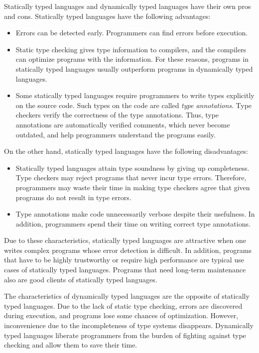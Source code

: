 Statically typed languages and dynamically typed languages have their own pros
and cons. Statically typed languages have the following advantages:
\begin{itemize}
  \item
Errors can be detected early. Programmers can find errors before execution.
  \item
    Static type checking
gives type information to compilers, and the compilers can optimize programs
with the information. For these reasons, programs in statically typed languages
usually outperform programs in dynamically typed languages.
  \item
    Some statically typed languages require programmers to write types explicitly
    on the source code. Such types on the code are called \textit{type
    annotations}. Type checkers verify the correctness of
    the type annotations. Thus, type annotations are automatically verified comments, which never
    become outdated, and help programmers understand the programs easily.
\end{itemize}
On the other hand, statically typed languages have the following disadvantages:
\begin{itemize}
  \item
Statically typed languages attain type soundness by giving up completeness.
Type checkers may reject programs that never incur type errors.
Therefore, programmers may waste their time in making type
checkers agree that given programs do not result in type errors.
  \item
Type annotations make code unnecessarily verbose despite their usefulness.
In addition, programmers spend their time on writing correct type annotations.
\end{itemize}

Due to these characteristics, statically typed languages are attractive when one
writes complex programs whose error detection is difficult. In addition, programs
that have to be highly trustworthy or require high performance are typical use
cases of statically typed languages. Programs that need long-term maintenance
also are good clients of statically typed languages.

The characteristics of dynamically typed languages are the opposite of
statically typed languages. Due to the lack of static type checking, errors
are discovered during execution, and programs lose some chances of optimization.
However, inconvenience due to the incompleteness of type systems disappears.
Dynamically typed languages liberate programmers from the burden of fighting
against type checking and allow them to save their time.

